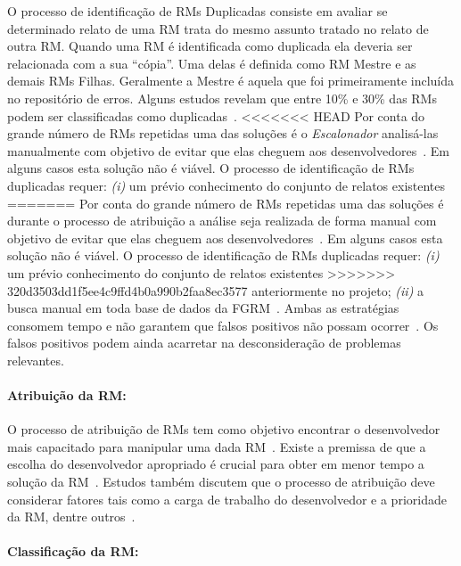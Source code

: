 O processo de identificação de RMs Duplicadas consiste em avaliar se determinado
relato de uma RM trata do mesmo assunto tratado no relato de outra RM\@. Quando
uma RM é identificada como duplicada ela deveria ser relacionada com a sua
``cópia''. Uma delas é definida como RM Mestre e as demais RMs Filhas.
Geralmente a Mestre é aquela que foi primeiramente incluída no repositório de
erros. Alguns estudos revelam que entre 10\% e 30\% das RMs podem ser
classificadas como
duplicadas~\cite{anvik2005coping,cavalcanti2013bug,Runeson:2007:DDD:1248820.1248882}.
<<<<<<< HEAD
Por conta do grande número de RMs repetidas uma das soluções é o
\textit{Escalonador} analisá-las manualmente com objetivo de evitar que elas
cheguem aos desenvolvedores~\cite{anvik2005coping}. Em alguns casos esta
solução não é viável. O processo de identificação de RMs duplicadas requer:
\textit{(i)} um prévio conhecimento do conjunto de relatos existentes
=======
Por conta do grande número de RMs repetidas uma das soluções é durante o
processo de atribuição a análise seja realizada de forma manual com objetivo de
evitar que elas cheguem aos desenvolvedores~\cite{anvik2005coping}. Em alguns
casos esta solução não é viável. O processo de identificação de RMs duplicadas
requer: \textit{(i)} um prévio conhecimento do conjunto de relatos existentes
>>>>>>> 320d3503dd1f5ee4c9ffd4b0a990b2faa8ec3577
anteriormente no projeto; \textit{(ii)} a busca manual em toda base de dados da
FGRM~\cite{banerjee2012automated,
    Lerch:2013:FDY:2495256.2495763,hindle2016contextual}. Ambas as estratégias
consomem tempo e não garantem que falsos positivos não possam
ocorrer~\cite{kaushik2012comparative}. Os falsos positivos podem ainda
acarretar na desconsideração de problemas relevantes.

\paragraph{Atribuição da RM:}

O processo de atribuição de RMs tem como objetivo encontrar o desenvolvedor
mais capacitado para manipular uma dada RM~\cite{cavalcanti2014challenges}.
Existe a premissa de que a escolha do desenvolvedor apropriado é crucial para
obter em menor tempo a so\-lu\-ção da RM~\cite{di2002approach}. Estudos também
discutem que o processo de atribuição deve considerar fatores tais como a carga
de trabalho do desenvolvedor e a prioridade da RM, dentre
outros~\cite{aljarah2011selecting}.

\paragraph{Classificação da RM:}

